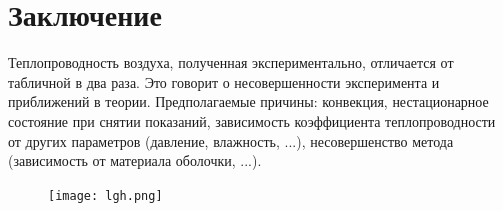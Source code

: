 \documentclass[a4paper,12pt]{article} %
\begin{document}
\newpage
\section{Заключение}
Теплопроводность воздуха, полученная экспериментально, отличается от табличной в два раза. Это говорит о несовершенности эксперимента и приближений в теории.
Предполагаемые причины: конвекция, нестационарное состояние при снятии показаний, зависимость коэффициента теплопроводности от других параметров (давление, влажность, ...), несовершенство метода (зависимость от материала оболочки, ...).
\begin{figure}[h!]
\begin{floatrow}
         {\texttt{[image: lgh.png]}}     
\end{floatrow}
\end{figure}
\end{document}
